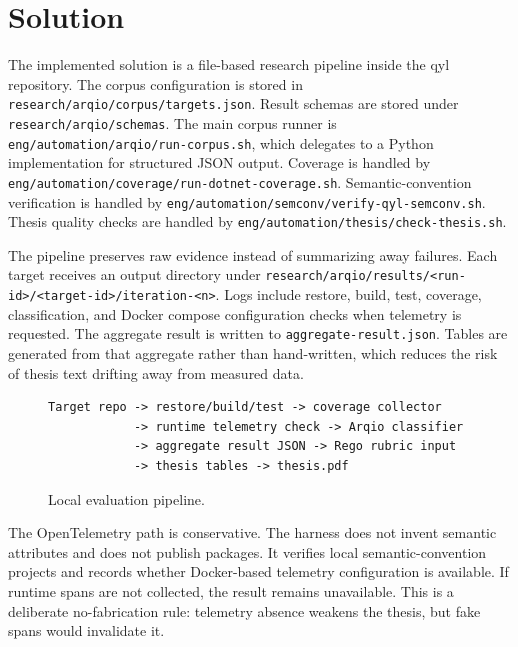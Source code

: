 \chapter{Solution}

The implemented solution is a file-based research pipeline inside the qyl repository. The corpus configuration is stored in \texttt{research/arqio/corpus/targets.json}. Result schemas are stored under \texttt{research/arqio/schemas}. The main corpus runner is \texttt{eng/automation/arqio/run-corpus.sh}, which delegates to a Python implementation for structured JSON output. Coverage is handled by \texttt{eng/automation/coverage/run-dotnet-coverage.sh}. Semantic-convention verification is handled by \texttt{eng/automation/semconv/verify-qyl-semconv.sh}. Thesis quality checks are handled by \texttt{eng/automation/thesis/check-thesis.sh}.

The pipeline preserves raw evidence instead of summarizing away failures. Each target receives an output directory under \texttt{research/arqio/results/<run-id>/<target-id>/iteration-<n>}. Logs include restore, build, test, coverage, classification, and Docker compose configuration checks when telemetry is requested. The aggregate result is written to \texttt{aggregate-result.json}. Tables are generated from that aggregate rather than hand-written, which reduces the risk of thesis text drifting away from measured data.

\begin{figure}[h]
\centering
\begin{verbatim}
Target repo -> restore/build/test -> coverage collector
            -> runtime telemetry check -> Arqio classifier
            -> aggregate result JSON -> Rego rubric input
            -> thesis tables -> thesis.pdf
\end{verbatim}
\caption{Local evaluation pipeline.}
\end{figure}

The OpenTelemetry path is conservative. The harness does not invent semantic attributes and does not publish packages. It verifies local semantic-convention projects and records whether Docker-based telemetry configuration is available. If runtime spans are not collected, the result remains unavailable. This is a deliberate no-fabrication rule: telemetry absence weakens the thesis, but fake spans would invalidate it.
